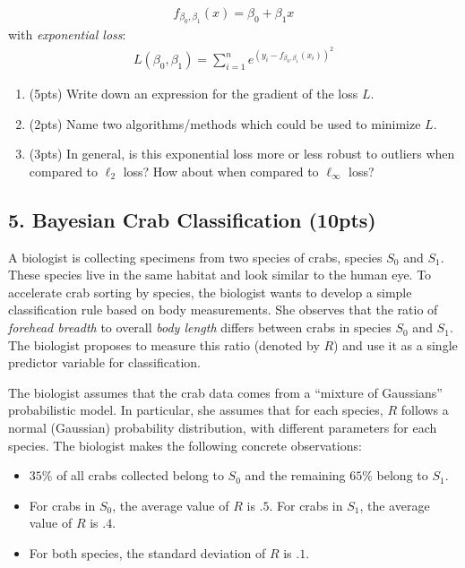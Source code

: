 \documentclass[10pt]{article}
\begin{document}
\begin{align*}
f_{\beta_0,\beta_1}(x) = \beta_0 + \beta_1 x
\end{align*}
with \emph{exponential loss}:
\begin{align*}
L(\beta_0,\beta_1) = \sum_{i=1}^n e^{(y_i - f_{\beta_0,\beta_1}(x_i))^2}
\end{align*}

\begin{enumerate}[label=(\alph*)]
	\item (5pts) Write down an expression for the gradient of the loss $L$.
	\vspace{16em}
	\item (2pts) Name two algorithms/methods which could be used to minimize $L$.
	\vspace{12em}
	\item (3pts) In general, is this exponential loss more or less robust to outliers when compared to $\ell_2$ loss? How about when compared to $\ell_\infty$ loss? 
\end{enumerate}


\newpage

\subsection{5. Bayesian Crab Classification (\textbf{\small 10pts})}
A biologist is collecting specimens from two species of crabs, species $S_0$ and $S_1$. These species live in the same habitat and look similar to the human eye. To accelerate crab sorting by species, the biologist wants to develop a simple classification rule based on body measurements. She observes that the ratio of \emph{forehead breadth} to overall \emph{body length} differs between crabs in species $S_0$ and $S_1$. The biologist proposes to measure this ratio (denoted by $R$) and use it as a single predictor variable for classification.

The biologist assumes that the crab data comes from a ``mixture of Gaussians'' probabilistic model. In particular, she assumes that for each species, $R$ follows a normal (Gaussian) probability distribution, with different parameters for each species. The biologist makes the following concrete observations:
\begin{itemize}
	\item $35\%$ of all crabs collected belong to $S_0$ and the remaining $65\%$ belong to $S_1$. 
	\item For crabs in $S_0$, the average value of $R$ is $.5$. For crabs in $S_1$, the average value of $R$ is $.4$. 
	\item For both species, the standard deviation of $R$ is $.1$.
\end{itemize}
\end{document}
